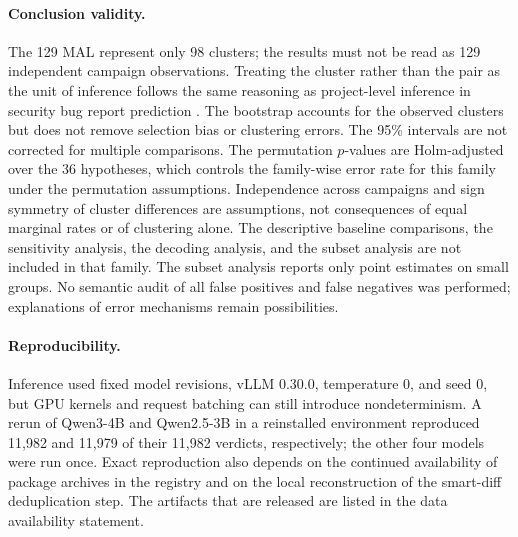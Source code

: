 \documentclass[a4paper,fleqn]{cas-dc}
\begin{document}
\paragraph{Conclusion validity.}
The 129 MAL represent only 98 clusters; the results must not be read as 129
independent campaign observations. Treating the cluster rather than the pair as
the unit of inference follows the same reasoning as project-level inference in
security bug report prediction \citep{jamwal2027llmsec}. The bootstrap accounts for the observed
clusters but does not remove selection bias or clustering errors. The 95\%
intervals are not corrected for multiple comparisons. The permutation
$p$-values are Holm-adjusted over the 36 hypotheses, which controls the
family-wise error rate for this family under the permutation assumptions.
Independence across campaigns and sign symmetry of cluster differences are
assumptions, not consequences of equal marginal rates or of clustering alone.
The descriptive baseline
comparisons, the sensitivity analysis, the decoding analysis, and the subset
analysis are not included in that family.  The subset analysis reports
only point estimates on small groups. No semantic audit of all false positives and
false negatives was performed; explanations of error mechanisms remain
possibilities.

\paragraph{Reproducibility.}
Inference used fixed model revisions, vLLM 0.30.0, temperature 0, and seed 0, but
GPU kernels and request batching can still introduce nondeterminism. A rerun of
Qwen3-4B and Qwen2.5-3B in a reinstalled environment reproduced 11,982 and 11,979
of their 11,982 verdicts, respectively; the other four models were run once.
Exact reproduction also depends on the continued
availability of package archives in the registry and on the local reconstruction
of the smart-diff deduplication step. The artifacts that are released are listed
in the data availability statement.
\end{document}

